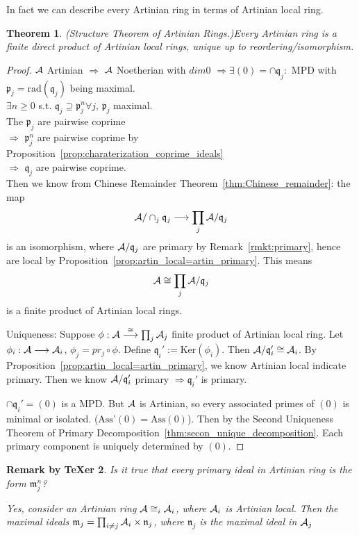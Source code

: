 \documentclass[11pt]{article}
\newtheorem{thm}{Theorem}[section]
\newtheorem{rmkt}[thm]{Remark by TeXer}
\newcommand{\scm}{{\mathfrak m}}
\newcommand{\scn}{{\mathfrak n}}
\newcommand{\scp}{{\mathfrak p}}
\newcommand{\scq}{\mathfrak q}
\newcommand{\cala}{{\cal A}}
\newcommand{\Lrta}{\Longrightarrow}
\newcommand{\lrta}{\longrightarrow}
\begin{document}
In fact we can describe every Artinian   ring in terms of Artinian   local ring.
\begin{thm}(Structure Theorem of Artinian   Rings.)\label{thm:Artin_product_of_Artin_local}
Every Artinian   ring is a finite direct product of Artinian   local rings, unique up to reordering/isomorphism.
\end{thm}
\begin{proof}
$\cala$ Artinian   $\Lrta $ $\cala$ Noetherian with $dim 0$ $\Lrta\exists (0)=\cap\scq_j:$ MPD with $\scp_j=\text{rad}(\scq_j)$ being maximal.\\
$\exists n\geq 0$  s.t. $\scq_j\supseteq \scp_j^n\forall j$, $\scp_j$ maximal.\\
The $\scp_j$ are pairwise coprime\\
$\Lrta$ $\scp_j^n$ are pairwise coprime by Proposition~\ref{prop:charaterization_coprime_ideals}\\
$\Lrta$ $\scq_j$ are pairwise coprime.\\ Then we know from Chinese Remainder Theorem~\ref{thm:Chinese_remainder}:
the map
$$
\cala/\cap_j\scq_j\lrta \prod_j \cala/\scq_j
$$
 is an isomorphism, where $\cala/\scq_j$ are primary by Remark~\ref{rmkt:primary}, hence are local by Proposition~\ref{prop:artin_local=artin_primary}.
 This means 
 $$
\cala\cong\prod_j \cala/\scq_j
 $$
is a finite product of Artinian   local rings.

Uniqueness: Suppose $\phi:\cala\overset{\cong}{\lrta}\prod_j\cala_j$ finite product of Artinian   local ring. Let $\phi_i:\cala\lrta \cala_i$, $\phi_j=pr_j\circ\phi$. Define $\scq_i':=\text{Ker}(\phi_i)$. Then $\cala/\scq'_i\cong \cala_i$. By Proposition~\ref{prop:artin_local=artin_primary}, we know Artinian   local indicate primary. Then we know $\cala/\scq_i'$ primary $\Lrta\scq_i'$ is primary.

$\cap\scq_i'=(0)$ is a MPD.
But $\cala$ is Artinian, so every associated primes of $(0)$ is minimal or isolated. ($\text{Ass'}(0)=\text{Ass}(0)$).  Then by the Second Uniqueness Theorem of Primary Decomposition~\ref{thm:secon_unique_decomposition}. Each primary component is uniquely determined by $(0)$.
\end{proof}
\begin{rmkt}
Is it true that every primary ideal in Artinian   ring is the form $\scm_j^n$?

Yes, consider an Artinian ring $\cala\cong_i \cala_i$, where $\cala_i$ is Artinian local. Then the maximal ideals $\scm_j=\prod_{i\neq j}\cala_i\times \scn_j$, where $\scn_j$ is the maximal ideal in $\cala_j$
\end{rmkt}
\end{document}
